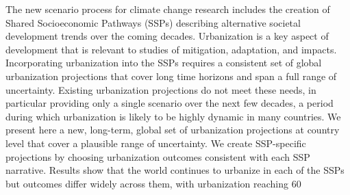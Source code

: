 The new scenario process for climate change research includes the creation of Shared Socioeconomic Pathways (SSPs) describing alternative societal development trends over the coming decades. Urbanization is a key aspect of development that is relevant to studies of mitigation, adaptation, and impacts. Incorporating urbanization into the SSPs requires a consistent set of global urbanization projections that cover long time horizons and span a full range of uncertainty. Existing urbanization projections do not meet these needs, in particular providing only a single scenario over the next few decades, a period during which urbanization is likely to be highly dynamic in many countries. We present here a new, long-term, global set of urbanization projections at country level that cover a plausible range of uncertainty. We create SSP-specific projections by choosing urbanization outcomes consistent with each SSP narrative. Results show that the world continues to urbanize in each of the SSPs but outcomes differ widely across them, with urbanization reaching 60%